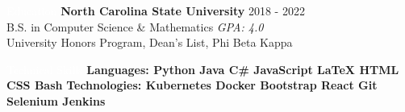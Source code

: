 \documentclass{resume}
\begin{document}
\setlength\fboxsep{0.33em}

\begin{rSection}{\colorbox{NCSURED}{\textcolor{WHITE}{Education}}}
{\bf North Carolina State University} \hfill {2018 - 2022} \\ 
B.S. in Computer Science \& Mathematics \hfill {\em GPA: 4.0}\\
University Honors Program, Dean's List, Phi Beta Kappa

\end{rSection}

\begin{rSection}{\colorbox{NCSURED}{\textcolor{WHITE}{Technical Skills}}}
	\textbf{Languages:
		\hspace*{0.275cm}
		{Python} \textbar
		{ Java} \textbar
		{ C\#} \textbar
		{ JavaScript} \textbar
		{ \LaTeX} \textbar
		{ HTML} \textbar
		{ CSS} \textbar
		{ Bash}
	} \newline
	\textbf{Technologies:
		{Kubernetes} \textbar
		{ Docker} \textbar
		{ Bootstrap} \textbar
		{ React} \textbar
		{ Git} \textbar
		{ Selenium} \textbar
		{ Jenkins}
	}	
\end{rSection}
\end{document}
